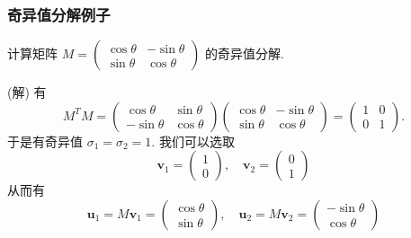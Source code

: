 \begin{frame}
\frametitle{奇异值分解例子}

\begin{eg}
计算矩阵 $M = \begin{pmatrix} \cos\theta & -\sin\theta \\ \sin\theta & \cos\theta \end{pmatrix}$ 的奇异值分解.
\end{eg}

\vspace{1em}
\pause

\startproof[bg=yellow, fg=red](解)
有
\[M^TM = \begin{pmatrix} \cos\theta & \sin\theta \\ -\sin\theta & \cos\theta \end{pmatrix} \begin{pmatrix} \cos\theta & -\sin\theta \\ \sin\theta & \cos\theta \end{pmatrix} = \begin{pmatrix} 1 & 0 \\ 0 & 1 \end{pmatrix}.\]
于是有奇异值 $\sigma_1 = \sigma_2 = 1.$ 我们可以选取
\[\mathbf{v}_1 = \begin{pmatrix} 1 \\ 0 \end{pmatrix}, \quad \mathbf{v}_2 = \begin{pmatrix} 0 \\ 1 \end{pmatrix}\]
从而有
\[\mathbf{u}_1 = M\mathbf{v}_1 = \begin{pmatrix} \cos\theta \\ \sin\theta \end{pmatrix}, \quad \mathbf{u}_2 = M\mathbf{v}_2 = \begin{pmatrix} -\sin\theta \\ \cos\theta \end{pmatrix}\]

\end{frame}


